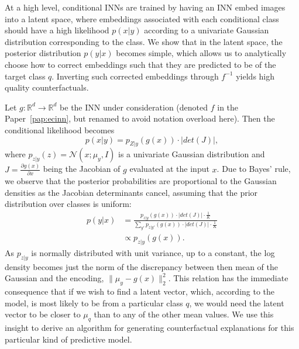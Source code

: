 \documentclass[11pt,a4paper,twoside,openright,final]{memoir}
\newcommand*{\paperref}[1]{Paper~\hyperref[#1]{\ref{#1}}}
\begin{document}
At a high level, conditional INNs are trained by having an INN embed images into a latent space, where embeddings associated with each conditional class should have a high likelihood $p(x|y)$ according to a univariate Gaussian distribution corresponding to the class.
We show that in the latent space, the posterior distribution $p(y|x)$ becomes simple, which allows us to analytically choose how to correct embeddings such that they are predicted to be of the target class $q$. 
Inverting such corrected embeddings through $f^{-1}$ yields high quality counterfactuals. 

Let $g: \mathbb{R}^{d} \rightarrow \mathbb{R}^{d}$ be the INN under consideration (denoted $f$ in the \paperref{pap:ecinn}, but renamed to avoid notation overload here).
Then the conditional likelihood becomes
\begin{equation}\label{eq:conditional-likelihood}
    p(x | y) = p_{Z|y}(g(x)) \cdot \left| det\left( J \right)\right|,
\end{equation}
where $p_{z|y}(z) = \mathcal{N}(x; \mu_y, I)$ is a univariate Gaussian distribution and $J=\frac{\partial g(x)}{\partial x}$ being the Jacobian of $g$ evaluated at the input $x$. 
Due to  Bayes' rule, we observe that the posterior probabilities are proportional to the Gaussian densities as the Jacobian determinants cancel, assuming that the prior distribution over classes is uniform: 
\begin{align}\label{eq:proportional} 
    p(y | x) &= \frac{p_{z|y}( g(x) ) \cdot \left| det\left( J \right)\right| \cdot \frac{1}{K}}{\sum_{y'} p_{z|y'}( g(x) ) \cdot \left| det \left(  J \right) \right| \cdot \frac{1}{K}}\\
    &\propto p_{z|y}(g(x)).
\end{align}
As $p_{z|y}$ is normally distributed with unit variance, up to a constant, the log density becomes just the norm of the discrepancy between then mean of the Gaussian and the encoding, $\|\mu_y - g(x)\|_2^2$. 
This relation has the immediate consequence that if we wish to find a latent vector, which, according to the model, is most likely to be from a particular class $q$, we would need the latent vector to be closer to $\mu_q$ than to any of the other mean values. 
We use this insight to derive an algorithm for generating counterfactual explanations for this particular kind of predictive model. 
\end{document}
